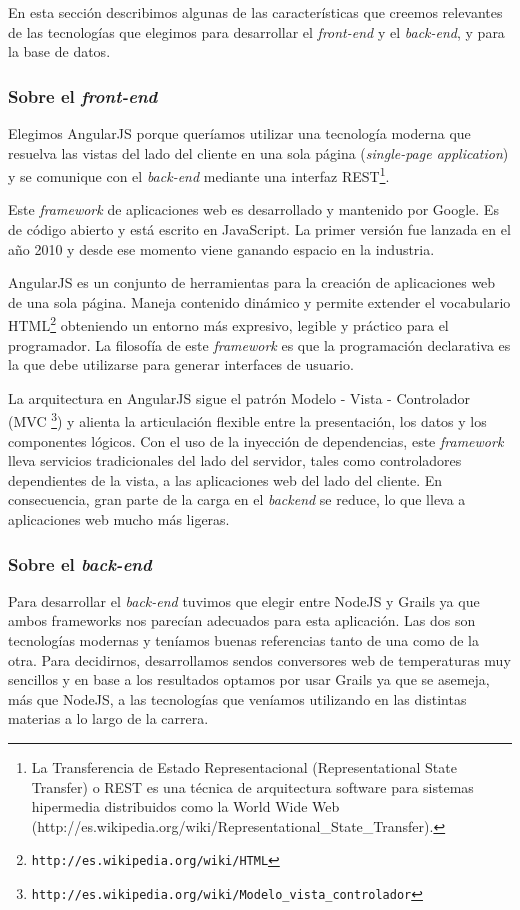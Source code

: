 En esta sección describimos algunas de las características que creemos relevantes de las tecnologías que elegimos para desarrollar el \textit{front-end} y el \textit{back-end}, y para la base de datos.

\subsubsection{Sobre el \textit{front-end}}
Elegimos AngularJS porque queríamos utilizar una tecnología moderna que resuelva las vistas del lado del cliente en una sola página (\textit{single-page application}) y se comunique con el \textit{back-end} mediante una interfaz REST\footnote{La Transferencia de Estado Representacional (Representational State Transfer) o REST es una técnica de arquitectura software para sistemas hipermedia distribuidos como la World Wide Web (http://es.wikipedia.org/wiki/Representational\_State\_Transfer).}.

Este \textit{framework} de aplicaciones web es desarrollado y mantenido por Google. Es de código abierto y está escrito en JavaScript. La primer versión fue lanzada en el año 2010 y desde ese momento viene ganando espacio en la industria. 

AngularJS es un conjunto de herramientas para la creación de aplicaciones web de una sola página. Maneja contenido dinámico y permite extender el vocabulario HTML\footnote{\texttt{http://es.wikipedia.org/wiki/HTML}} obteniendo un entorno más expresivo, legible y práctico para el programador. La filosofía de este \textit{framework} es que la programación declarativa es la que debe utilizarse para generar interfaces de usuario.

La arquitectura en AngularJS sigue el patrón Modelo - Vista - Controlador (MVC  \footnote{\texttt{http://es.wikipedia.org/wiki/Modelo\_vista\_controlador}}) y alienta la articulación flexible entre la presentación, los datos y los componentes lógicos. Con el uso de la inyección de dependencias, este \textit{framework} lleva servicios tradicionales del lado del servidor, tales como controladores dependientes de la vista, a las aplicaciones web del lado del cliente. En consecuencia, gran parte de la carga en el \textit{backend} se reduce, lo que lleva a aplicaciones web mucho más ligeras.

\subsubsection{Sobre el \textit{back-end}}
Para desarrollar el \textit{back-end} tuvimos que elegir entre NodeJS y Grails ya que ambos frameworks nos parecían adecuados para esta aplicación. Las dos son tecnologías modernas y teníamos buenas referencias tanto de una como de la otra. Para decidirnos, desarrollamos sendos conversores web de temperaturas muy sencillos y en base a los resultados optamos por usar Grails ya que se asemeja, más que NodeJS, a las tecnologías que veníamos utilizando en las distintas materias a lo largo de la carrera.

